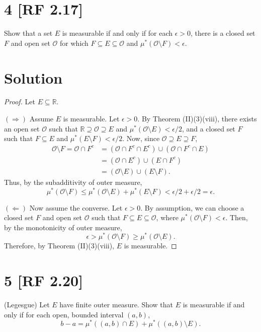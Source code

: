 \documentclass[12pt]{article}
\begin{document}
\newpage
\section*{4 [RF 2.17]}
Show that a set $E$ is measurable if and only if for each $\epsilon > 0$, there is a closed set $F$ and open set $\mathcal{O}$ for which $F \subseteq E\subseteq
\mathcal{O}$ and $\mu^{*}(\mathcal{O}\setminus F) < \epsilon$.

\section*{Solution}
\begin{proof}
Let $E \subseteq \mathbb{R}$.

$(\Rightarrow)$ Assume $E$ is measurable. Let $\epsilon > 0$. By Theorem (II)(3)(viii), there exists an open set $\mathcal{O}$ such that $\mathbb{R}
\supseteq \mathcal{O} \supseteq E$ and $\mu^{*}(\mathcal{O} \setminus E) < \epsilon / 2$, and a closed set $F$ such that $F \subseteq E$ and $\mu^{*}(E\setminus F) <
\epsilon / 2$. Now, since $\mathcal{O} \supseteq E \supseteq F$, 
\begin{align*}
\mathcal{O} \setminus F = \mathcal{O}\cap F^{c} & = (\mathcal{O}\cap F^{c} \cap E^{c}) \cup (\mathcal{O}\cap F^{c} \cap E) \\
& = \left( \mathcal{O}\cap E^{c} \right)\cup \left( E\cap F^{c} \right) \\
& = (\mathcal{O} \setminus E) \cup (E\setminus F). 
\end{align*}
Thus, by the subadditivity of outer measure,
\[ \mu^{*}(\mathcal{O}\setminus F) \leq \mu^{*}(\mathcal{O}\setminus E) + \mu^{*}(E\setminus F) < \epsilon / 2  + \epsilon / 2 = \epsilon. \]

$(\Leftarrow)$ Now assume the converse. Let $\epsilon > 0$. By assumption, we can choose a closed set $F$ and open set $\mathcal{O}$ such that $F\subseteq E
\subseteq \mathcal{O}$, where $\mu^{*}(\mathcal{O}\setminus F) < \epsilon$. Then, by the monotonicity of outer measure,
\[ \epsilon > \mu^{*}(\mathcal{O} \setminus F) \geq \mu^{*}(\mathcal{O} \setminus E). \]
Therefore, by Theorem (II)(3)(viii), $E$ is measurable.
\end{proof}






\newpage
\section*{5 [RF 2.20]}
(Legesgue) Let $E$ have finite outer measure. Show that $E$ is measurable if and only if for each open, bounded interval $(a,b)$,
\[ b - a = \mu^{*}\left( (a,b) \cap E \right) + \mu^{*}\left( (a,b) \setminus E \right). \]
\end{document}
